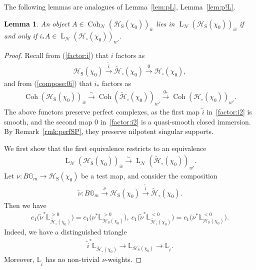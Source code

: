 \documentclass[11pt,oneside,a4paper,mathscr]{amsart}
\newtheorem{lemma}[thm]{Lemma}
\theoremstyle{definition}
\newcommand{\LL}{\operatorname{L}}
\newcommand{\cH}{\mathcal{H}}
\newcommand{\bgm}{B\mathbb{G}_m}
\newcommand{\Coh}{\operatorname{Coh}}
\newcommand{\rS}{\mathrm{S}}
\begin{document}
The following lemmas are analogues of
Lemma~\ref{lem:pL}, Lemma~\ref{lem:p!L}. 
\begin{lemma}\label{lem:i!}
An object $A \in \Coh_{\mathcal{N}}(\cH_{\rS}(\chi_0))_{\overline{w}}$ lies in 
$\LL_{\mathcal{N}}(\cH_{\rS}(\chi_0))_{\overline{w}}$ if and only if 
$i_{*}A \in \LL_{\mathcal{N}}(\cH_{\circ}(\chi_0))_{w'}$. 
\end{lemma}
\begin{proof}
Recall from (\ref{factor:i}) that $i$ factors as 
\begin{align}\label{factor:i2}
   \cH_{\rS}(\chi_0) \stackrel{\widetilde{i}}{\to} \widetilde{\cH}_{\circ}(\chi_0) \stackrel{0}{\to} \cH_{\circ}(\chi_0), 
\end{align}
and from 
(\ref{compose:0i}) that $i_{*}$ factors as 
\begin{align}\label{factor:i*}
\Coh(\cH_{\rS}(\chi_0))_{\overline{w}} 
\stackrel{\sim}{\to} 
\Coh(\widetilde{\cH}_{\circ}(\chi_0))_{w'} 
\stackrel{0_{*}}{\to}
\Coh(\cH_{\circ}(\chi_0))_{w'}.
\end{align}
The above functors preserve perfect complexes, as 
the first map $\widetilde{i}$ in~\eqref{factor:i2} is smooth, and the second 
map $0$ in~\eqref{factor:i2} is a quasi-smooth closed immersion. 
By Remark~\ref{rmk:perfSP}, they preserve nilpotent singular supports. 

We first show that the first equivalence restricts to an equivalence
\begin{align}\label{equiv:rest}
\LL_{\mathcal{N}}(\cH_{\rS}(\chi_0))_{\overline{w}} 
\stackrel{\sim}{\to} 
\LL_{\mathcal{N}}(\widetilde{\cH}_{\circ}(\chi_0))_{w'}.
\end{align}
Let $\nu \colon \bgm \to \cH_{\rS}(\chi_0)$ be a test map, and consider the composition 
\begin{align*}
\widetilde{\nu} \colon 
\bgm \stackrel{\nu}{\to} \cH_{\rS}(\chi_0) 
\stackrel{\widetilde{i}}{\to} 
\widetilde{\cH}_{\circ}(\chi_0).
\end{align*}
Then we have 
\begin{align*}
c_1\bigl(
\widetilde{\nu}^* 
\mathbb{L}^{>0}_{\widetilde{\cH}_{\circ}(\chi_0)}
\bigr)
=
c_1\bigl(
\nu^* 
\mathbb{L}_{\cH_{\rS}(\chi_0)}^{>0}
\bigr), \ c_1\bigl(
\widetilde{\nu}^* 
\mathbb{L}^{<0}_{\widetilde{\cH}_{\circ}(\chi_0)}
\bigr)
=
c_1\bigl(
\nu^* 
\mathbb{L}_{\cH_{\rS}(\chi_0)}^{<0}
\bigr).
\end{align*}
Indeed, we have a distinguished triangle
\begin{align*}
\widetilde{i}^* \mathbb{L}_{\widetilde{\cH}_{\circ}(\chi_0)}
\to 
\mathbb{L}_{\cH_{\rS}(\chi_0)}
\to 
\mathbb{L}_{\widetilde{i}}.
\end{align*}
Moreover, $\mathbb{L}_{\widetilde{i}}$ has no non-trivial $\nu$-weights.


\end{proof}
\end{document}
